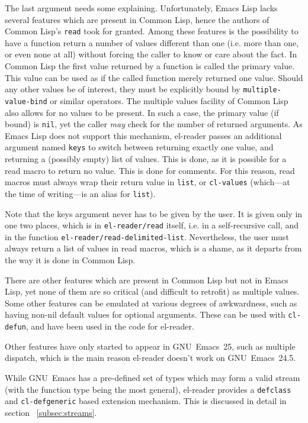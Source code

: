 \documentclass[a4paper,10pt,twoside]{report}
\newcommand{\el}{Emacs Lisp}
\newcommand{\cl}{Common Lisp}
\newcommand{\elr}{el-reader}
\newcommand{\sym}[1]{\texttt{#1}}
\newcommand{\fun}[1]{\texttt{#1}}
\newcommand{\emacs}{GNU~Emacs}
\newcommand{\emacsv}[1]{GNU~Emacs~#1}
\newcommand{\Read}{\fun{read}}
\begin{document}
The last argument needs some explaining.  Unfortunately, \el{} lacks several
features which are present in \cl{}, hence the authors of \cl{}’s \Read{} took
for granted.  Among these features is the possibility to have a function return
a number of values different than one (i.e. more than one, or even none at all)
without forcing the caller to know or care about the fact.  In \cl{} the first
value returned by a function is called the primary value.  This value can be
used as if the called function merely returned one value.  Should any other
values be of interest, they must be explicitly bound by
\sym{multiple-value-bind} or similar operators.  The multiple values facility of
\cl{} also allows for no values to be present.  In such a case, the primary
value (if bound) is \sym{nil}, yet the caller \emph{may} check for the number of
returned arguments.  As \el{} does not support this mechanism, \elr{} passes an
additional argument named \sym{keys} to switch between returning exactly one
value, and returning a (possibly empty) list of values.  This is done, as it is
possible for a read macro to return no value.  This is done for comments.  For
this reason, read macros must always wrap their return value in \fun{list}, or
\fun{cl-values} (which---at the time of writing---is an alias for \fun{list}).

Note that the keys argument never has to be given by the user.  It is given only
in one two places, which is in \fun{el-reader/read} itself, i.e. in a
self-recursive call, and in the function \fun{el-reader/read-delimited-list}.
Nevertheless, the user must always return a list of values in read macros, which
is a shame, as it departs from the way it is done in \cl{}.

There are other features which are present in \cl{} but not in \el{}, yet none
of them are so critical (and difficult to retrofit) as multiple values.  Some
other features can be emulated at various degrees of awkwardness, such as having
non-nil default values for optional arguments.  These can be used with
\fun{cl-defun}, and have been used in the code for \elr{}.

Other features have only started to appear in \emacsv{25}, such as multiple
dispatch, which is the main reason \elr{} doesn’t work on \emacsv{24.5}.

While \emacs{} has a pre-defined set of types which may form a valid stream
(with the function type being the most general), \elr{} provides a
\fun{defclass} and \fun{cl-defgeneric} based extension mechanism.  This is
discussed in detail in section ~\ref{subsec:streams}.
\end{document}
